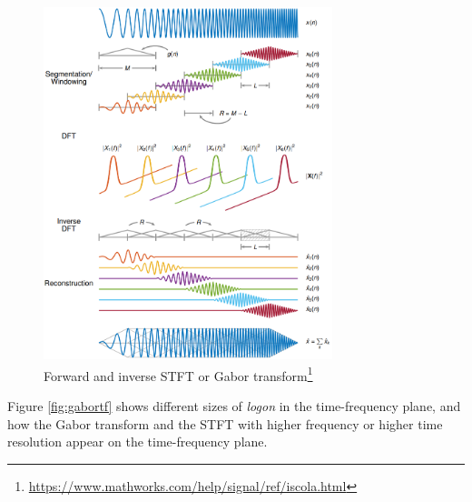 \documentclass[report.tex]{subfiles}
\begin{document}
\begin{figure}[ht]
	\centering
        \begin{minipage}{1.\textwidth}
		\renewcommand\footnoterule{} %
		\renewcommand{\thempfootnote}{\fnsymbol{mpfootnote}}
		\centering
		\includegraphics[width=0.7500\textwidth]{./images-tftheory/stft_diagram.png}
		\caption[Forward and inverse STFT or Gabor transform]{Forward and inverse STFT or Gabor transform\footnote[1]{\url{https://www.mathworks.com/help/signal/ref/iscola.html}}}
		\label{fig:stftdiagram}
	\end{minipage}
\end{figure}

Figure \ref{fig:gabortf} shows different sizes of \textit{logon} in the time-frequency plane, and how the Gabor transform and the STFT with higher frequency or higher time resolution appear on the time-frequency plane.
\end{document}
